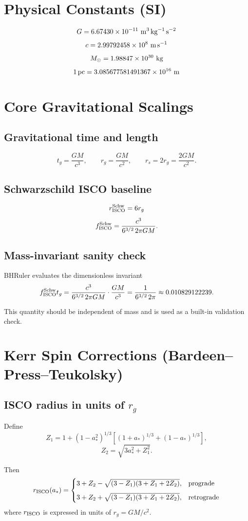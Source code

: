 \documentclass[12pt]{article}
\begin{document}
\section*{Physical Constants (SI)}

\[
G = 6.67430\times10^{-11}\ {\rm m^3\,kg^{-1}\,s^{-2}}
\]
\[
c = 2.99792458\times10^{8}\ {\rm m\,s^{-1}}
\]
\[
M_\odot = 1.98847\times10^{30}\ {\rm kg}
\]
\[
1\,{\rm pc} = 3.085677581491367\times10^{16}\ {\rm m}
\]

\section{Core Gravitational Scalings}

\subsection*{Gravitational time and length}
\[
t_g = \frac{GM}{c^3},
\qquad
r_g = \frac{GM}{c^2},
\qquad
r_s = 2r_g = \frac{2GM}{c^2}.
\]

\subsection*{Schwarzschild ISCO baseline}
\[
r_{\rm ISCO}^{\rm Schw} = 6r_g
\]
\[
f_{\rm ISCO}^{\rm Schw} = \frac{c^3}{6^{3/2}\,2\pi GM}.
\]

\subsection*{Mass-invariant sanity check}
BHRuler evaluates the dimensionless invariant
\[
f_{\rm ISCO}^{\rm Schw} t_g
= \frac{c^3}{6^{3/2}\,2\pi GM}\cdot\frac{GM}{c^3}
= \frac{1}{6^{3/2}\,2\pi}
\approx 0.010829122239.
\]

This quantity should be independent of mass and is used as a built-in validation check.

\section{Kerr Spin Corrections (Bardeen--Press--Teukolsky)}

\subsection*{ISCO radius in units of $r_g$}
Define
\[
Z_1 = 1 + (1-a_*^2)^{1/3}
\left[(1+a_*)^{1/3} + (1-a_*)^{1/3}\right],
\]
\[
Z_2 = \sqrt{3a_*^2 + Z_1^2}.
\]

Then
\[
r_{\rm ISCO}(a_*) =
\begin{cases}
3 + Z_2 - \sqrt{(3-Z_1)(3+Z_1+2Z_2)}, & \text{prograde} \\[6pt]
3 + Z_2 + \sqrt{(3-Z_1)(3+Z_1+2Z_2)}, & \text{retrograde}
\end{cases}
\]
where $r_{\rm ISCO}$ is expressed in units of $r_g=GM/c^2$.
\end{document}
